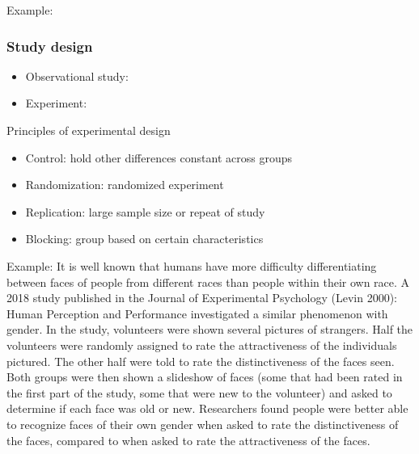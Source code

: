 \documentclass[
]{report}
\providecommand{\tightlist}{%
  \setlength{\itemsep}{0pt}\setlength{\parskip}{0pt}}
\begin{document}
Example:

\vspace{0.8in}

\hypertarget{study-design-1}{%
\subsubsection*{Study design}\label{study-design-1}}

\begin{itemize}
\tightlist
\item
  Observational study:
\end{itemize}

\vspace{0.5in}

\begin{itemize}
\tightlist
\item
  Experiment:
\end{itemize}

\vspace{0.5in}

Principles of experimental design

\begin{itemize}
\item
  Control: hold other differences constant across groups
  \vspace{0.1in}
\item
  Randomization: randomized experiment
  \vspace{0.1in}
\item
  Replication: large sample size or repeat of study
  \vspace{0.1in}
\item
  Blocking: group based on certain characteristics
\end{itemize}

\vspace{0.1in}

Example: It is well known that humans have more difficulty differentiating between faces of people from different races than people within their own race. A 2018 study published in the Journal of Experimental Psychology (Levin 2000): Human Perception and Performance investigated a similar phenomenon with gender. In the study, volunteers were shown several pictures of strangers. Half the volunteers were randomly assigned to rate the attractiveness of the individuals pictured. The other half were told to rate the distinctiveness of the faces seen. Both groups were then shown a slideshow of faces (some that had been rated in the first part of the study, some that were new to the volunteer) and asked to determine if each face was old or new. Researchers found people were better able to recognize faces of their own gender when asked to rate the distinctiveness of the faces, compared to when asked to rate the attractiveness of the faces.
\end{document}
